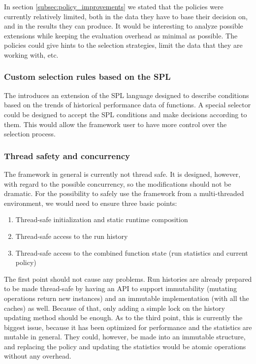 In section \ref{subsec:policy_improvements} we stated that the policies were currently relatively limited, both in the data they have to base their decision on, and in the results they can produce. It would be interesting to analyze possible extensions while keeping the evaluation overhead as minimal as possible. The policies could give hints to the selection strategies, limit the data that they are working with, etc.

\subsubsection{Custom selection rules based on the SPL}

The \cite{bulej_performance_2012} introduces an extension of the SPL language designed to describe conditions based on the trends of historical performance data of functions. A special selector could be designed to accept the SPL conditions and make decisions according to them. This would allow the framework user to have more control over the selection process. 

\subsubsection{Thread safety and concurrency}

The framework in general is currently not thread safe. It is designed, however, with regard to the possible concurrency, so the modifications should not be dramatic. For the possibility to safely use the framework from a multi-threaded environment, we would need to ensure three basic points:

\begin{enumerate}
	\item Thread-safe initialization and static runtime composition
	\item Thread-safe access to the run history
	\item Thread-safe access to the combined function state (run statistics and current policy)
\end{enumerate}

The first point should not cause any problems. Run histories are already prepared to be made thread-safe by having an API to support immutability (mutating operations return new instances) and an immutable implementation (with all the caches) as well. Because of that, only adding a simple lock on the history updating method should be enough. As to the third point, this is currently the biggest issue, because it has been optimized for performance and the statistics are mutable in general. They could, however, be made into an immutable structure, and replacing the policy and updating the statistics would be atomic operations without any overhead.

